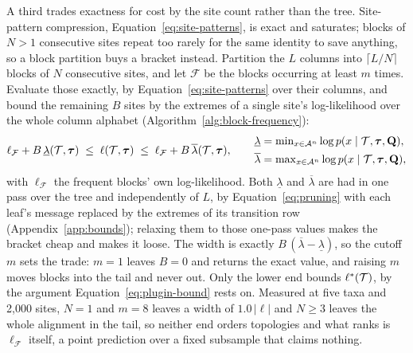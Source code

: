 \documentclass[11pt,a4paper]{article}
\begin{document}
A third trades exactness for cost by the site count rather than the tree.
Site-pattern compression, Equation~\ref{eq:site-patterns}, is exact and
saturates; blocks of $N > 1$ consecutive sites repeat too rarely for the same
identity to save anything, so a block partition buys a bracket instead.
Partition the $L$ columns into $\lceil L/N \rceil$ blocks of $N$
consecutive sites, and let $\mathcal{F}$ be the blocks occurring at least $m$
times. Evaluate those exactly, by Equation~\ref{eq:site-patterns} over their
columns, and bound the remaining $B$ sites by the extremes of a single site's
log-likelihood over the whole column alphabet
(Algorithm~\ref{alg:block-frequency}):
\begin{equation}
  \ell_{\mathcal{F}} + B \, \underline{\lambda}(\mathcal{T}, \boldsymbol{\tau})
  \;\le\; \ell(\mathcal{T}, \boldsymbol{\tau}) \;\le\;
  \ell_{\mathcal{F}} + B \, \overline{\lambda}(\mathcal{T}, \boldsymbol{\tau}),
  \qquad
  \begin{aligned}
    \underline{\lambda} &= \textstyle\min_{x \in \mathcal{A}^n}
      \log p(x \mid \mathcal{T}, \boldsymbol{\tau}, \mathbf{Q}), \\
    \overline{\lambda} &= \textstyle\max_{x \in \mathcal{A}^n}
      \log p(x \mid \mathcal{T}, \boldsymbol{\tau}, \mathbf{Q}),
  \end{aligned}
  \label{eq:block-frequency-bound}
\end{equation}
with $\ell_{\mathcal{F}}$ the frequent blocks' own log-likelihood. Both
$\underline\lambda$ and $\overline\lambda$ are had in one pass over the tree
and independently of $L$, by Equation~\ref{eq:pruning} with each leaf's
message replaced by the extremes of its transition row
(Appendix~\ref{app:bounds}); relaxing them to those one-pass values makes the
bracket cheap and makes it loose. The width is exactly
$B\,(\overline\lambda - \underline\lambda)$, so the cutoff $m$ sets the trade:
$m = 1$ leaves $B = 0$ and returns the exact value, and raising $m$ moves
blocks into the tail and never out. Only the lower end bounds
$\ell^\ast(\mathcal{T})$, by the argument Equation~\ref{eq:plugin-bound} rests on.
Measured at five taxa and 2,000
sites, $N = 1$ and $m = 8$ leaves a width of $1.0\,|\ell|$ and $N \ge 3$
leaves the whole alignment in the tail, so neither end orders topologies and
what ranks is $\ell_{\mathcal{F}}$ itself, a point prediction over a fixed
subsample that claims nothing.
\end{document}
